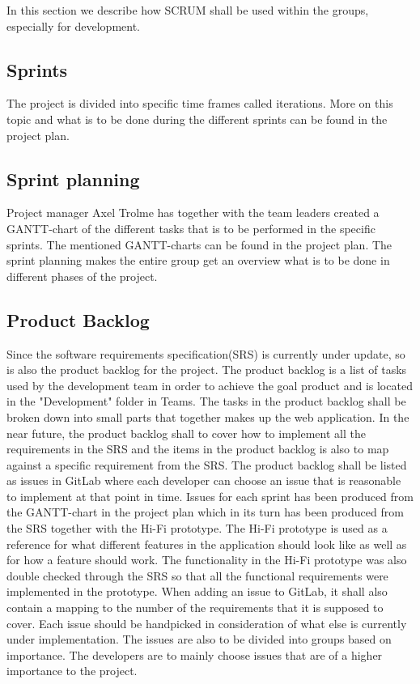 In this section we describe how SCRUM shall be used within the groups, especially for development. 

\subsection{Sprints}
The project is divided into specific time frames called iterations. More on this topic and what is to be done during the different sprints can be found in the project plan. 

\subsection{Sprint planning}
Project manager Axel Trolme has together with the team leaders created a GANTT-chart of the different tasks that is to be performed in the specific sprints. The mentioned GANTT-charts can be found in the project plan. The sprint planning makes the entire group get an overview what is to be done in different phases of the project. 

\subsection{Product Backlog}
Since the software requirements specification(SRS) is currently under update, so is also the product backlog for the project. The product backlog is a list of tasks used by the development team in order to achieve the goal product and is located in the "Development" folder in Teams. The tasks in the product backlog shall be broken down into small parts that together makes up the web application. In the near future, the product backlog shall to cover how to implement all the requirements in the SRS and the items in the product backlog is also to map against a specific requirement from the SRS. The product backlog shall be listed as issues in GitLab where each developer can choose an issue that is reasonable to implement at that point in time. Issues for each sprint has been produced from the GANTT-chart in the project plan which in its turn has been produced from the SRS together with the Hi-Fi prototype. The Hi-Fi prototype is used as a reference for what different features in the application should look like as well as for how a feature should work. The functionality in the Hi-Fi prototype was also double checked through the SRS so that all the functional requirements were implemented in the prototype.  When adding an issue to GitLab, it shall also contain a mapping to the number of the requirements that it is supposed to cover. Each issue should be handpicked in consideration of what else is currently under implementation. The issues are also to be divided into groups based on importance. The developers are to mainly choose issues that are of a higher importance to the project.  

